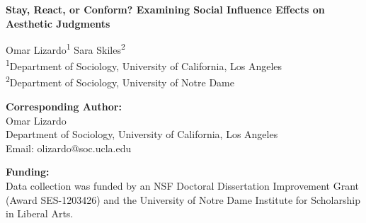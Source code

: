 \documentclass[12pt, letterpaper]{article}
\begin{document}
\begin{center}
{\LARGE \textbf{Stay, React, or Conform? Examining Social Influence Effects on Aesthetic Judgments}}

\vspace{1.5em}

{\large
Omar Lizardo\textsuperscript{1} \quad Sara Skiles\textsuperscript{2}\\[0.8em]
\textsuperscript{1}Department of Sociology, University of California, Los Angeles\\
\textsuperscript{2}Department of Sociology, University of Notre Dame\\
}
\end{center}

\vspace{2em}

\noindent\textbf{Corresponding Author:}\\
Omar Lizardo\\
Department of Sociology, University of California, Los Angeles\\
Email: olizardo@soc.ucla.edu

\vspace{2em}

\noindent\textbf{Funding:}\\
Data collection was funded by an NSF Doctoral Dissertation Improvement Grant
(Award SES-1203426) and the University of Notre Dame Institute for Scholarship
in Liberal Arts.

%
\end{document}
